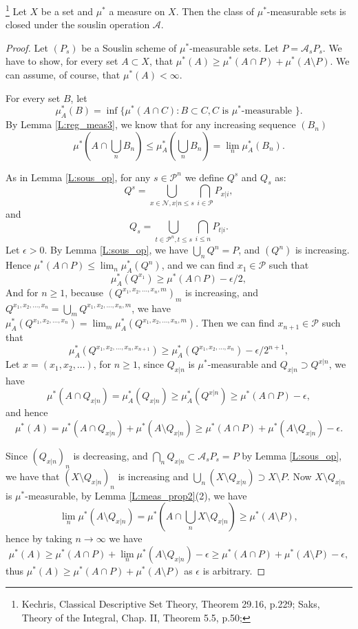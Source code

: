 \begin{theorem}
  \footnote{
    Kechris, Classical Descriptive Set Theory, Theorem 29.16, p.229;
    Saks, Theory of the Integral, Chap. II, Theorem 5.5, p.50;
  }
  Let $X$ be a set and $\mu^*$ a measure on $X$. Then the class of 
  $\mu^*$-measurable sets is closed under the souslin operation
  $\mathcal{A}$.
\end{theorem}
\begin{proof}
Let $(P_s)$ be a Souslin scheme of $\mu^*$-measurable sets.
Let $P=\mathcal{A}_s P_s$. We have to show, for every set $A\subset X$,
that $\mu^*(A)\ge \mu^*(A\cap P) + \mu^*(A\setminus P)$. We can assume,
of course, that $\mu^*(A)<\infty$.

For every set $B$, let
\[
  \mu^*_A(B)=\inf \{\mu^*(A\cap C): B\subset C, 
                    \text{$C$ is $\mu^*$-measurable } \}.
\]
By Lemma \ref{L:reg_meas3}, we know that for any increasing sequence $(B_n)$
\[
  \mu^*(A\cap \bigcup_n B_n)\le \mu^*_A(\bigcup_n B_n) = \lim_n \mu^*_A(B_n).
\]

As in Lemma \ref{L:sous_op}, for any $s\in\mathcal{P}^n$ we define $Q^s$ 
and $Q_s$ as:
\[
  Q^s = \bigcup_{x\in\mathcal{N}, x|n\le s} \bigcap_{i\in\mathcal{P}} P_{x|i},
\]
and
\[
  Q_s = \bigcup_{t\in\mathcal{P}^n, t\le s} \bigcap_{i\le n} P_{t|i}.
\]
Let $\epsilon>0$. 
By Lemma \ref{L:sous_op}, we have $\bigcup_n Q^n = P$, and $(Q^n)$ is 
increasing.
Hence $\mu^*(A\cap P)\le \lim_n \mu^*_A(Q^n)$, and we can find 
$x_1\in\mathcal{P}$ such that
\[
  \mu^*_A(Q^{x_1}) \ge \mu^*(A\cap P) - \epsilon / 2,
\]
And for $n\ge 1$, because $(Q^{x_1,x_2,\dots,x_n,m})_m$ is increasing,
and $Q^{x_1,x_2,\dots,x_n}=\bigcup_m Q^{x_1,x_2,\dots,x_n,m}$,
we have
$\mu^*_A(Q^{x_1,x_2,\dots,x_n}) = \lim_m \mu^*_A(Q^{x_1,x_2,\dots,x_n,m})$.
Then we can find $x_{n+1}\in\mathcal{P}$ such that
\[
  \mu^*_A(Q^{x_1,x_2,\dots,x_n,x_{n+1}}) 
    \ge \mu^*_A(Q^{x_1,x_2,\dots,x_n}) - \epsilon / 2^{n+1},
\]
Let $x=(x_1,x_2,\dots)$, for $n\ge 1$, since $Q_{x|n}$ is $\mu^*$-measurable 
and $Q_{x|n}\supset Q^{x|n}$, we have
\[
  \mu^*(A\cap Q_{x|n}) = \mu^*_A(Q_{x|n})
    \ge \mu^*_A(Q^{x|n}) \ge \mu^*(A\cap P)-\epsilon,
\]
and hence
\[
  \mu^*(A) = \mu^*(A\cap Q_{x|n}) + \mu^*(A\setminus Q_{x|n})
    \ge \mu^*(A\cap P) + \mu^*(A\setminus Q_{x|n}) - \epsilon.
\]

Since $(Q_{x|n})_n$ is decreasing, and 
$\bigcap_n Q_{x|n} \subset \mathcal{A}_s P_s = P$
by Lemma \ref{L:sous_op}, we have that $(X\setminus Q_{x|n})_n$ is increasing
and $\bigcup_n (X\setminus Q_{x|n}) \supset X\setminus P$.
Now $X\setminus Q_{x|n}$ is $\mu^*$-measurable, by 
Lemma \ref{L:meas_prop2}(2), we have
\[
  \lim_n \mu^*(A\setminus Q_{x|n}) 
    = \mu^*(A\cap \bigcup_n X\setminus Q_{x|n}) \ge \mu^*(A\setminus P),
\]
hence by taking $n\to \infty$ we have
\[
  \mu^*(A) 
    \ge \mu^*(A\cap P) + \lim_n \mu^*(A\setminus Q_{x|n}) - \epsilon
    \ge \mu^*(A\cap P) + \mu^*(A\setminus P) - \epsilon,
\]
thus $\mu^*(A) \ge \mu^*(A\cap P) + \mu^*(A\setminus P)$ as $\epsilon$ is
arbitrary.


\end{proof}
